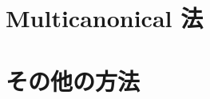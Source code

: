 \documentclass[11pt,a4papaer]{jsarticle}
\begin{document}
\newpage

\section{Multicanonical 法 \label{sec_05MC}}
\setcounter{equation}{0}
\renewcommand{\theequation}{\arabic{section}-\arabic{equation}}
%

\newpage

\section{その他の方法 \label{sec_06others}}
\setcounter{equation}{0}
\renewcommand{\theequation}{\arabic{section}-\arabic{equation}}
%

%
%


%
\end{document}
